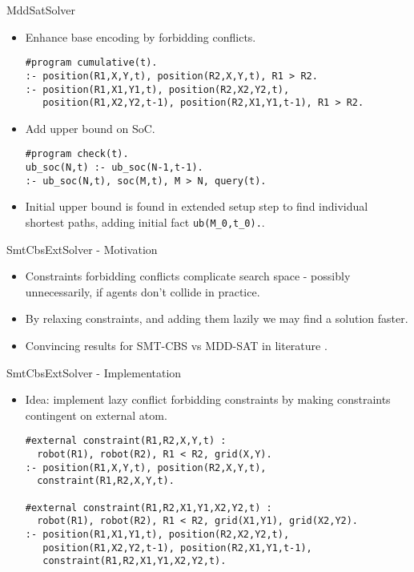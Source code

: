 \documentclass[aspectratio=169,xcolor=svgnames]{beamer}
\theoremstyle{theoremstyle_space}
\begin{document}
\begin{frame}[fragile=singleslide]{MddSatSolver}
\begin{itemize}
    \item Enhance base encoding by forbidding conflicts.
\begin{verbatim}
#program cumulative(t).
:- position(R1,X,Y,t), position(R2,X,Y,t), R1 > R2.
:- position(R1,X1,Y1,t), position(R2,X2,Y2,t), 
   position(R1,X2,Y2,t-1), position(R2,X1,Y1,t-1), R1 > R2.
\end{verbatim}
    \item Add upper bound on SoC.
\begin{verbatim}
#program check(t).
ub_soc(N,t) :- ub_soc(N-1,t-1).
:- ub_soc(N,t), soc(M,t), M > N, query(t).
\end{verbatim}
    \item Initial upper bound is found in extended setup step to find individual shortest paths, adding initial fact \verb|ub(M_0,t_0).|.
\end{itemize}
\end{frame}

\begin{frame}[fragile=singleslide]{SmtCbsExtSolver - Motivation}
\begin{itemize}
    \item Constraints forbidding conflicts complicate search space - possibly unnecessarily, if agents don't collide in practice.
    \item By relaxing constraints, and adding them lazily we may find a solution faster.
    \item Convincing results for SMT-CBS vs MDD-SAT in literature \cite{ijcai2019p164}.

\end{itemize}
\end{frame}

\begin{frame}[fragile=singleslide]{SmtCbsExtSolver - Implementation}
\begin{itemize}
    \item Idea: implement lazy conflict forbidding constraints by making constraints contingent on external atom.
    \begin{verbatim}
#external constraint(R1,R2,X,Y,t) : 
  robot(R1), robot(R2), R1 < R2, grid(X,Y).
:- position(R1,X,Y,t), position(R2,X,Y,t),
  constraint(R1,R2,X,Y,t).

#external constraint(R1,R2,X1,Y1,X2,Y2,t) : 
  robot(R1), robot(R2), R1 < R2, grid(X1,Y1), grid(X2,Y2).
:- position(R1,X1,Y1,t), position(R2,X2,Y2,t), 
   position(R1,X2,Y2,t-1), position(R2,X1,Y1,t-1),
   constraint(R1,R2,X1,Y1,X2,Y2,t).
    \end{verbatim}

\end{itemize}
\end{frame}
\end{document}
